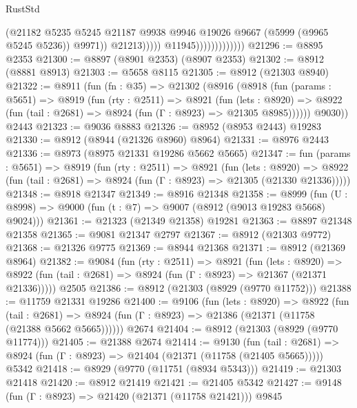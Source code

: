 \begin{lexlean}{RustStd}
\begin{coremodule}
                                          (@21182
                                            @5235
                                            @5245
                                            @21187
                                            @9938
                                            @9946
                                            @19026
                                            @9667
                                            (@5999 (@9965 @5245 @5236))
                                            @9971))
                                        @21213)))))
                              @11945)))))))))))))
@21296 := @8895 @2353
@21300 := @8897 (@8901 @2353) (@8907 @2353)
@21302 := @8912 (@8881 @8913)
@21303 := @5658 @8115
@21305 := @8912 (@21303 @8940)
@21322 := @8911
    (fun (fn : @35) =>
    @21302
      (@8916
        (@8918
          (fun (params : @5651) =>
          @8919
            (fun (rty : @2511) =>
            @8921
              (fun (lets : @8920) =>
              @8922 (fun (tail : @2681) => @8924 (fun (Γ : @8923) => @21305 @8985))))))
        @9030))
    @2443
@21323 := @9036 @8883
@21326 := @8952 (@8953 @2443) @19283
@21330 := @8912 (@8944 (@21326 @8960) @8964)
@21331 := @8976 @2443
@21336 := @8973 (@8975 @21331 @19286 @5662 @5665)
@21347 := fun (params : @5651) =>
  @8919
    (fun (rty : @2511) =>
    @8921
      (fun (lets : @8920) =>
      @8922 (fun (tail : @2681) => @8924 (fun (Γ : @8923) => @21305 (@21330 @21336)))))
@21348 := @8918 @21347
@21349 := @8916 @21348
@21358 := @8999
    (fun (U : @8998) => @9000 (fun (t : @7) => @9007 (@8912 (@9013 @19283 @5668) @9024)))
@21361 := @21323 (@21349 @21358) @19281
@21363 := @8897 @21348 @21358
@21365 := @9081 @21347 @2797
@21367 := @8912 (@21303 @9772)
@21368 := @21326 @9775
@21369 := @8944 @21368
@21371 := @8912 (@21369 @8964)
@21382 := @9084
    (fun (rty : @2511) =>
    @8921
      (fun (lets : @8920) =>
      @8922 (fun (tail : @2681) => @8924 (fun (Γ : @8923) => @21367 (@21371 @21336)))))
    @2505
@21386 := @8912 (@21303 (@8929 (@9770 @11752)))
@21388 := @11759 @21331 @19286
@21400 := @9106
    (fun (lets : @8920) =>
    @8922
      (fun (tail : @2681) =>
      @8924 (fun (Γ : @8923) => @21386 (@21371 (@11758 (@21388 @5662 @5665))))))
    @2674
@21404 := @8912 (@21303 (@8929 (@9770 @11774)))
@21405 := @21388 @2674
@21414 := @9130
    (fun (tail : @2681) => @8924 (fun (Γ : @8923) => @21404 (@21371 (@11758 (@21405 @5665)))))
    @5342
@21418 := @8929 (@9770 (@11751 (@8934 @5343)))
@21419 := @21303 @21418
@21420 := @8912 @21419
@21421 := @21405 @5342
@21427 := @9148 (fun (Γ : @8923) => @21420 (@21371 (@11758 @21421))) @9845

\end{coremodule}
\end{lexlean}
